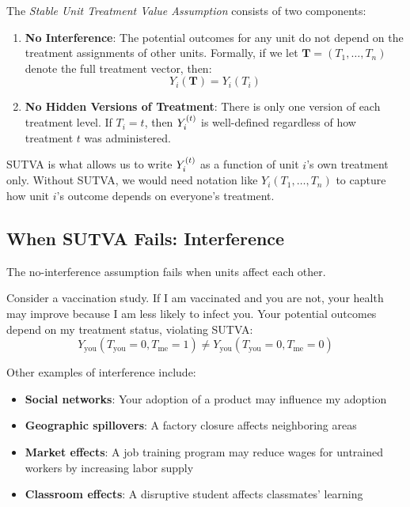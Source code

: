 \begin{definition}[SUTVA]
\label{def:sutva}
The \emph{Stable Unit Treatment Value Assumption} consists of two components:

\begin{enumerate}
    \item \textbf{No Interference}: The potential outcomes for any unit do not depend on the treatment assignments of other units. Formally, if we let $\mathbf{T} = (T_1, \ldots, T_n)$ denote the full treatment vector, then:
    \begin{equation}
    Y_i(\mathbf{T}) = Y_i(T_i)
    \label{eq:no_interference}
    \end{equation}

    \item \textbf{No Hidden Versions of Treatment}: There is only one version of each treatment level. If $T_i = t$, then $Y^{(t)}_i$ is well-defined regardless of how treatment $t$ was administered.
\end{enumerate}
\end{definition}

SUTVA is what allows us to write $Y^{(t)}_i$ as a function of unit $i$'s own treatment only. Without SUTVA, we would need notation like $Y_i(T_1, \ldots, T_n)$ to capture how unit $i$'s outcome depends on everyone's treatment.

\subsection{When SUTVA Fails: Interference}

The no-interference assumption fails when units affect each other.

\begin{example}
\label{ex:vaccine_spillover}
Consider a vaccination study. If I am vaccinated and you are not, your health may improve because I am less likely to infect you. Your potential outcomes depend on my treatment status, violating SUTVA:
\begin{equation}
Y_{\text{you}}(T_{\text{you}} = 0, T_{\text{me}} = 1) \neq Y_{\text{you}}(T_{\text{you}} = 0, T_{\text{me}} = 0)
\end{equation}
\end{example}

Other examples of interference include:
\begin{itemize}
    \item \textbf{Social networks}: Your adoption of a product may influence my adoption
    \item \textbf{Geographic spillovers}: A factory closure affects neighboring areas
    \item \textbf{Market effects}: A job training program may reduce wages for untrained workers by increasing labor supply
    \item \textbf{Classroom effects}: A disruptive student affects classmates' learning
\end{itemize}

